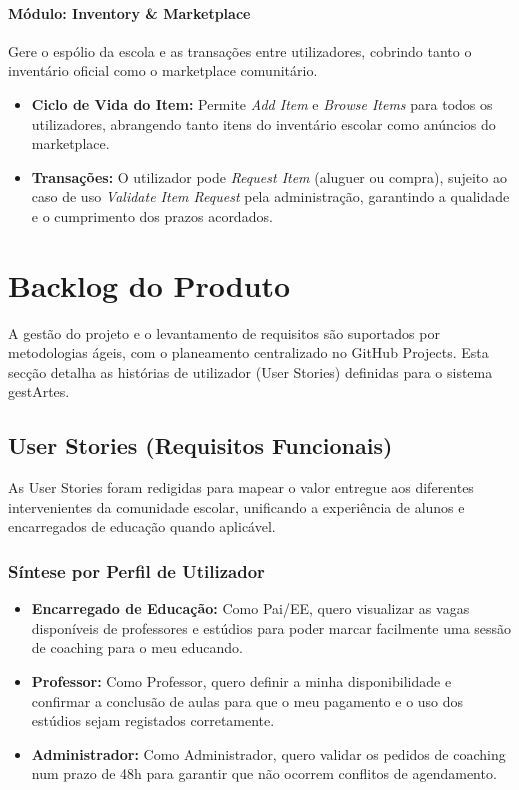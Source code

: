 \documentclass[12pt,a4paper]{report}
\begin{document}
\subsubsection{Módulo: Inventory \& Marketplace}
Gere o espólio da escola e as transações entre utilizadores, cobrindo tanto o inventário oficial como o marketplace comunitário.
\begin{itemize}
    \item \textbf{Ciclo de Vida do Item:} Permite \textit{Add Item} e \textit{Browse Items} para todos os utilizadores, abrangendo tanto itens do inventário escolar como anúncios do marketplace.
    \item \textbf{Transações:} O utilizador pode \textit{Request Item} (aluguer ou compra), sujeito ao caso de uso \textit{Validate Item Request} pela administração, garantindo a qualidade e o cumprimento dos prazos acordados.
\end{itemize}


\chapter{Backlog do Produto}

A gestão do projeto e o levantamento de requisitos são suportados por metodologias ágeis, com o planeamento centralizado no GitHub Projects. Esta secção detalha as histórias de utilizador (User Stories) definidas para o sistema gestArtes.

\section{User Stories (Requisitos Funcionais)}

As User Stories foram redigidas para mapear o valor entregue aos diferentes intervenientes da comunidade escolar, unificando a experiência de alunos e encarregados de educação quando aplicável.

\subsection{Síntese por Perfil de Utilizador}
\begin{itemize}
    \item \textbf{Encarregado de Educação:} Como Pai/EE, quero visualizar as vagas disponíveis de professores e estúdios para poder marcar facilmente uma sessão de coaching para o meu educando.
    \item \textbf{Professor:} Como Professor, quero definir a minha disponibilidade e confirmar a conclusão de aulas para que o meu pagamento e o uso dos estúdios sejam registados corretamente.
    \item \textbf{Administrador:} Como Administrador, quero validar os pedidos de coaching num prazo de 48h para garantir que não ocorrem conflitos de agendamento.
\end{itemize}
\end{document}
